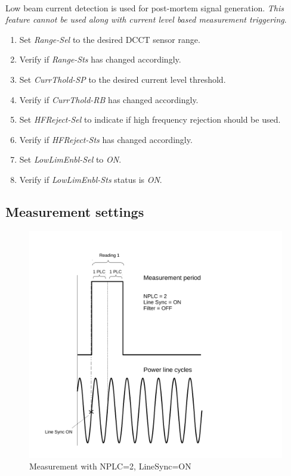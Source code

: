 \documentclass[openany]{article}
\begin{document}
		\paragraph{} Low beam current detection is used for post-mortem signal generation. \emph{This feature cannot be used along with current level based measurement triggering}.

			\begin{enumerate}
				\item Set \emph{Range-Sel} to the desired DCCT sensor range.
				\item Verify if \emph{Range-Sts} has changed accordingly.
				\item Set \emph{CurrThold-SP} to the desired current level threshold.
				\item Verify if \emph{CurrThold-RB} has changed accordingly.
				\item Set \emph{HFReject-Sel} to indicate if high frequency rejection should be used.
				\item Verify if \emph{HFReject-Sts} has changed accordingly.
				\item Set \emph{LowLimEnbl-Sel} to \emph{ON}.
				\item Verify if \emph{LowLimEnbl-Sts} status is \emph{ON}.
			\end{enumerate}

	\subsection{Measurement settings}\label{measurement-settings}

		\begin{figure}[!h]
			\caption{Measurement with NPLC=2, LineSync=ON}
			\label{fig:meas-param1}
			\centering
			\includegraphics[width=1.0\textwidth]{dcct-meas-param1-image}
		\end{figure}
\end{document}
